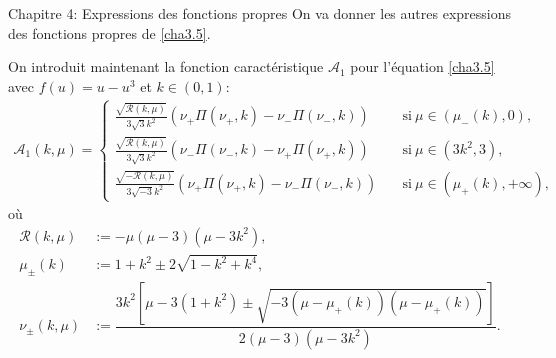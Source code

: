 \documentclass[mathserif,10pt]{beamer}
\begin{document}
\begin{frame}{Chapitre 4: Expressions des fonctions propres }\transglitter[duration=1]
 On va donner les autres expressions des fonctions propres de \eqref{cha3.5}.

\pause
On introduit maintenant la fonction caractéristique $\mathcal{A}_{1}$ pour l'équation \eqref{cha3.5} avec $f(u)=u-u^{3}$ et $ k \in (0,1)$:
\begin{align*}
\mathcal{A}_{1}(k,\mu )=
\begin{cases}
\frac{\sqrt{\mathcal{R}(k,\mu)}  }{3\sqrt{3}k^{2} } (\nu_{+}\Pi (\nu_{+},k)-\nu_{-}\Pi (\nu_{-},k)) \quad &\mathrm{si }\  \mu \in (\mu_{-}(k),0),\\
\frac{\sqrt{\mathcal{R}(k,\mu)}  }{3\sqrt{3}k^{2} } (\nu_{-}\Pi (\nu_{-},k)-\nu_{+}\Pi (\nu_{+},k)) \quad &\mathrm{si } \ \mu \in (3k^{2},3),\\
\frac{\sqrt{-\mathcal{R}(k,\mu)}  }{3\sqrt{-3}k^{2} } (\nu_{+}\Pi (\nu_{+},k)-\nu_{-}\Pi (\nu_{-},k)) \quad & \mathrm{si } \ \mu \in (\mu_{+}(k),+\infty ),
\end{cases}
\end{align*}
où 
\begin{align}
\mathcal{R}(k,\mu )& := -\mu (\mu -3)(\mu -3k^{2}),\\
 \mu_{\pm }(k)& := 1+k^{2}\pm 2\sqrt{1-k^{2}+k^{4}},\\
  \nu_{\pm }(k,\mu )& :=\dfrac{ 3k^{2}[\mu -3(1+k^{2})\pm\sqrt{-3(\mu -\mu_{+}(k))(\mu -\mu_{+}(k)) }] }{ 2(\mu -3)(\mu -3k^{2})}.
\end{align}

\end{frame}
\end{document}
